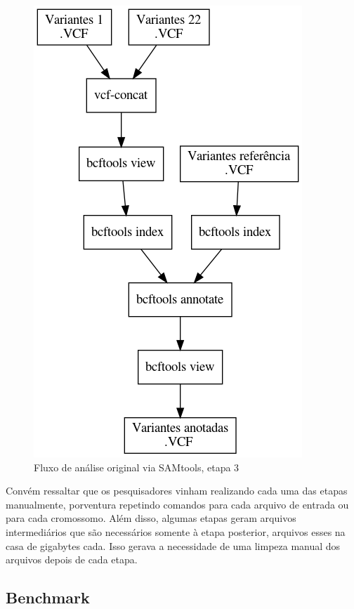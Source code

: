 \documentclass[cic,tc]{iiufrgs}
\begin{document}
\begin{figure}
  \caption{Fluxo de análise original via SAMtools, etapa 3}
    \begin{center}
      \includegraphics[width=0.85\linewidth]{img/stage3_orig.png}
    \end{center}
    \label{fig:stage3_orig}
\end{figure}

Convém ressaltar que os pesquisadores vinham realizando cada uma das etapas
manualmente, porventura repetindo comandos para cada arquivo de entrada ou para
cada cromossomo. Além disso, algumas etapas geram arquivos intermediários que
são necessários somente à etapa posterior, arquivos esses na casa de gigabytes
cada. Isso gerava a necessidade de uma limpeza manual dos arquivos depois de
cada etapa.

\subsection{Benchmark}
\end{document}
